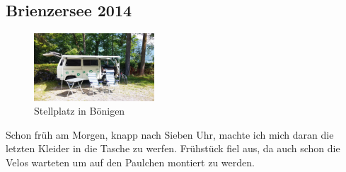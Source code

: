 % 

\subsection{Brienzersee 2014}

\begin{figure} 
  \begin{center}
    \includegraphics[width=0.4\textwidth]{../Bilder/Brienzersee/1.jpg}
    \caption{Stellplatz in Bönigen}
  \end{center}
\end{figure} 

Schon früh am Morgen, knapp nach Sieben Uhr, machte ich mich daran die letzten Kleider in die Tasche zu werfen.
Frühstück fiel aus, da auch schon die Velos warteten um auf den Paulchen montiert zu werden.

